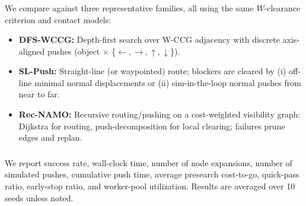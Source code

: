 \subsubsection{}
\label{subsec:algo-config}

\subsubsection{}
\label{subsec:baselines}
We compare against three representative families, all using the same
$W$-clearance criterion and contact models:

\begin{itemize}\itemsep2pt
  \item \textbf{DFS-WCCG:} Depth-first search over W-CCG adjacency with
  discrete axis-aligned pushes (object $\times$ \{$\leftarrow,\rightarrow,\uparrow,\downarrow$\}).
  \item \textbf{SL-Push:} Straight-line (or waypointed) route; blockers are
  cleared by (i) off-line minimal normal displacements or
  (ii) sim-in-the-loop normal pushes from near to far.
  \item \textbf{Rec-NAMO:} Recursive routing/pushing on a cost-weighted
  visibility graph: Dijkstra for routing, push-decomposition for local
  clearing; failures prune edges and replan.
\end{itemize}

\subsubsection{}
\label{subsec:metrics}
We report success rate, wall-clock time, number of node expansions,
number of simulated pushes, cumulative push time, average presearch
cost-to-go, quick-pass ratio, early-stop ratio, and worker-pool
utilization. Results are averaged over 10 seeds unless noted.

